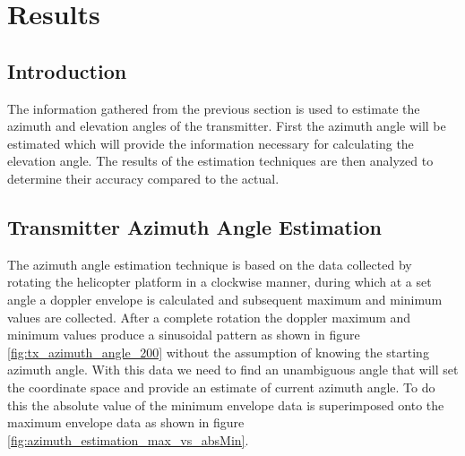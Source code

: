 \chapter{Results}

\section{Introduction}
The information gathered from the previous section is used to estimate the azimuth and elevation angles of the transmitter. First the azimuth angle will be estimated which will provide the information necessary for calculating the elevation angle. The results of the estimation techniques are then analyzed to determine their accuracy compared to the actual.


\section{Transmitter Azimuth Angle Estimation}
The azimuth angle estimation technique is based on the data collected by rotating the helicopter platform in a clockwise manner, during which at a set angle a doppler envelope is calculated and subsequent maximum and minimum values are collected. After a complete rotation the doppler maximum and minimum values produce a sinusoidal pattern as shown in figure \ref{fig:tx_azimuth_angle_200} without the assumption of knowing the starting azimuth angle. With this data we need to find an unambiguous angle that will set the coordinate space and provide an estimate of current azimuth angle. To do this the absolute value of the minimum envelope data is superimposed onto the maximum envelope data as shown in figure \ref{fig:azimuth_estimation_max_vs_absMin}.

